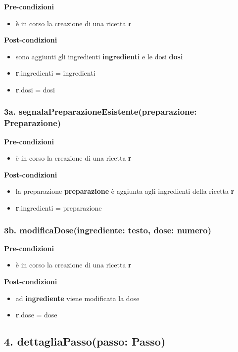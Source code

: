 \documentclass[14pt]{extarticle}
\begin{document}
\textbf{Pre-condizioni}
\begin{itemize}
  \item è in corso la creazione di una ricetta  \textbf{r}
\end{itemize}
\textbf{Post-condizioni}
\begin{itemize}
  \item sono aggiunti gli ingredienti  \textbf{ingredienti} e le dosi  \textbf{dosi}
  \item \textbf{r}.ingredienti = ingredienti
  \item \textbf{r}.dosi = dosi
\end{itemize}

\subsubsection*{3a. segnalaPreparazioneEsistente(preparazione: Preparazione)}

\textbf{Pre-condizioni}
\begin{itemize}
  \item è in corso la creazione di una ricetta  \textbf{r}
\end{itemize}
\textbf{Post-condizioni}
\begin{itemize}
  \item la preparazione  \textbf{preparazione} è aggiunta agli ingredienti della ricetta  \textbf{r}
  \item \textbf{r}.ingredienti = preparazione
\end{itemize}

\subsubsection*{3b. modificaDose(ingrediente: testo, dose: numero)}

\textbf{Pre-condizioni}
\begin{itemize}
  \item è in corso la creazione di una ricetta  \textbf{r}
\end{itemize}
\textbf{Post-condizioni}
\begin{itemize}
  \item ad  \textbf{ingrediente} viene modificata la dose
  \item \textbf{r}.dose = dose
\end{itemize}

\subsection*{4. dettagliaPasso(passo: Passo)}
\end{document}
